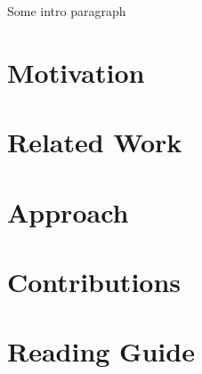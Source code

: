 Some intro paragraph

\section{Motivation}
\label{sec:intro:motivation}

\section{Related Work}
\label{sec:intro:related}


\section{Approach}
\label{sec:intro:approach}


\section{Contributions}
\label{sec:intro:contributions}


\section{Reading Guide}
\label{sec:intro:reading-guide}


